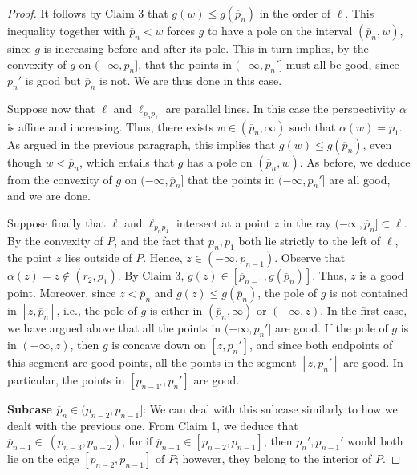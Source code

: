 \documentclass[11pt]{amsart}
\theoremstyle{remark}
\numberwithin{equation}{section}
\renewcommand{\leq}{\leqslant}
\begin{document}
\begin{proof}
It follows by Claim 3 that $g(w)\leq g(\overline p_n)$ in the order of $\ell$. This inequality together with $\overline p_n <w$  forces $g$ to have a pole on the interval $(\overline p_n,w)$, since $g$ is increasing before and after its pole. This in turn implies, by the convexity of $g$ on $(-\infty,\overline p_n]$, that the points in $(-\infty,p_n']$ must  all be good, since $p_n'$ is good but $\overline p_n$ is not. We are thus done in this case.

Suppose now that $\ell$ and $\ell_{p_{n}p_1}$ are parallel lines. In this case the perspectivity $\alpha$ is affine and increasing. Thus,  there exists  $w\in (\overline p_n,\infty)$ such that $\alpha(w)=p_1$. As argued in the previous paragraph, this implies that $g(w)\leq g(\overline p_n)$, even though $w<\overline p_n$, which entails that $g$ has a pole on $(\overline p_n,w)$. As before, we deduce from the convexity of $g$ on $(-\infty,\overline p_n]$ that the points in $(-\infty,p_n']$ are all good, and we are done.


Suppose finally that $\ell$ and $\ell_{p_{n}p_1}$ intersect at a point $z$ in the ray $(-\infty,\overline p_n]\subset \ell$. By the convexity of $P$, and the fact that $p_n,p_1$ both lie strictly to the left of $\ell$, the point $z$ lies outside of $P$. Hence, $z\in (-\infty,\overline p_{n-1})$. Observe that $\alpha(z)=z\notin (r_2,p_1)$. By Claim 3, $g(z)\in [\overline p_{n-1},g(\overline p_n)]$. Thus, $z$ is a good point. Moreover, since  $z<\overline p_n$ and $g(z)\leq g(\overline p_n)$, the pole of $g$ is not contained in $[z,\overline p_n]$, i.e., the pole of $g$ is either in $(\overline p_n,\infty)$ or $(-\infty, z)$. In the first case, we have argued 
above that all the points in $(-\infty,p_n']$ are good. If the pole of $g$ is in $(-\infty,z)$, then $g$ is concave down on $[z,p_n']$, and since both endpoints of this segment are good points, all the points in the segment $[z,p_n']$ are good. In particular, the points in $[p_{n-1'},p_n']$ are good.





\textbf{Subcase $\overline p_n\in (p_{n-2},p_{n-1}]$}: We can deal with this subcase similarly to how we   dealt with the previous one. 
From Claim 1, we deduce that  $\overline p_{n-1}\in\ (p_{n-3},p_{n-2})$, for if $\overline p_{n-1}\in [p_{n-2},p_{n-1}]$, then
 $p_n',p_{n-1}'$ would both lie on the edge $[p_{n-2},p_{n-1}]$ of $P$; however,  they belong to the interior of $P$.



\end{proof}
\end{document}
